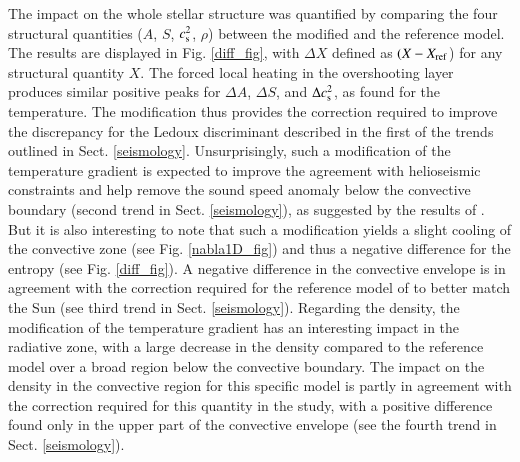 \documentclass[traditabstract]{aa}
\newcommand{\3}{\ss}
\newcommand{\ct}{\citet}
\begin{document}
{The impact on the whole stellar structure was quantified by comparing the four structural quantities ($A$, $S$, $c_{\rm s}^2$, $\rho$) between the modified and the reference model. 
The results are displayed in Fig. \ref{diff_fig}, with $\Delta X$ defined as $(X - X_{\rm ref}$) for any structural quantity $X$. The forced local heating in the overshooting layer produces similar positive peaks for $\Delta A$, $\Delta S$, and $\Delta c_{\rm s}^2$, as found for the temperature.  The modification thus provides the correction required to improve the discrepancy for the Ledoux discriminant described 
in the first of the trends outlined in Sect. \ref{seismology}.
Unsurprisingly, such a modification of the temperature gradient is expected to improve the agreement with helioseismic constraints and help remove the sound speed anomaly below the convective boundary (second trend in Sect. \ref{seismology}), as suggested by the results of \ct{christensen11}. But it is also interesting to note that such a modification yields a slight cooling of the convective zone (see Fig. \ref{nabla1D_fig}) and thus a negative difference for the entropy (see  Fig. \ref{diff_fig}).  
A negative difference in the convective envelope is in agreement with the correction required for the reference model of \ct{buldgen20} to better match the Sun (see third trend in Sect. \ref{seismology}).  
Regarding the density, the modification of the temperature gradient has an interesting impact in the radiative zone, with a large decrease in the density compared to the reference model over a broad region below the convective boundary. The impact on the density in the convective region for this specific model is  partly in agreement with the correction required for this quantity in the \ct{buldgen20} study,  with a positive difference found only in the upper part of the convective envelope} (see the fourth trend in Sect. \ref{seismology}).
\end{document}
